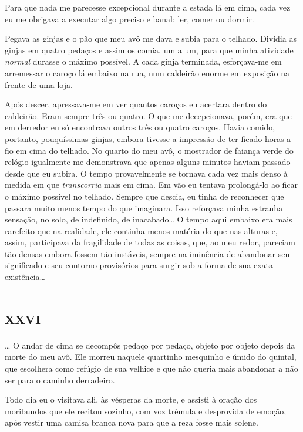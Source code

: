 Para que nada me parecesse excepcional durante a estada lá em cima, cada vez eu me obrigava a executar algo preciso e banal: ler, comer ou dormir.

Pegava as ginjas e o pão que meu avô me dava e subia para o telhado. Dividia as ginjas em quatro pedaços e assim os comia, um a um, para que minha atividade \textit{normal} durasse o máximo possível. A cada ginja terminada, esforçava-me em arremessar o caroço lá embaixo na rua, num caldeirão enorme em exposição na frente de uma loja.

Após descer, apressava-me em ver quantos caroços eu acertara dentro do caldeirão. Eram sempre três ou quatro. O que me decepcionava, porém, era que em derredor eu só encontrava outros três ou quatro caroços. Havia comido, portanto, pouquíssimas ginjas, embora tivesse a impressão de ter ficado horas a fio em cima do telhado. No quarto do meu avô, o mostrador de faiança verde do relógio igualmente me demonstrava que apenas alguns minutos haviam passado desde que eu subira. O tempo provavelmente se tornava cada vez mais denso à medida em que \textit{transcorria} mais em cima. Em vão eu tentava prolongá-lo ao ficar o máximo possível no telhado. Sempre que descia, eu tinha de reconhecer que passara muito menos tempo do que imaginara. Isso reforçava minha estranha sensação, no solo, de indefinido, de inacabado\ldots{} O tempo aqui embaixo era mais rarefeito que na realidade, ele continha menos matéria do que nas alturas e, assim, participava da fragilidade de todas as coisas, que, ao meu redor, pareciam tão densas embora fossem tão instáveis, sempre na iminência de abandonar seu significado e seu contorno provisórios para surgir sob a forma de sua exata existência\ldots{}


\chapter*{\huge\centering\textsc{xxvi}}

\ldots{} O andar de cima se decompôs pedaço por pedaço, objeto por objeto depois da morte do meu avô. Ele morreu naquele quartinho mesquinho e úmido do quintal, que escolhera como refúgio de sua velhice e que não queria mais abandonar a não ser para o caminho derradeiro.

Todo dia eu o visitava ali, às vésperas da morte, e assisti à oração dos moribundos que ele recitou sozinho, com voz trêmula e desprovida de emoção, após vestir uma camisa branca nova para que a reza fosse mais solene.

